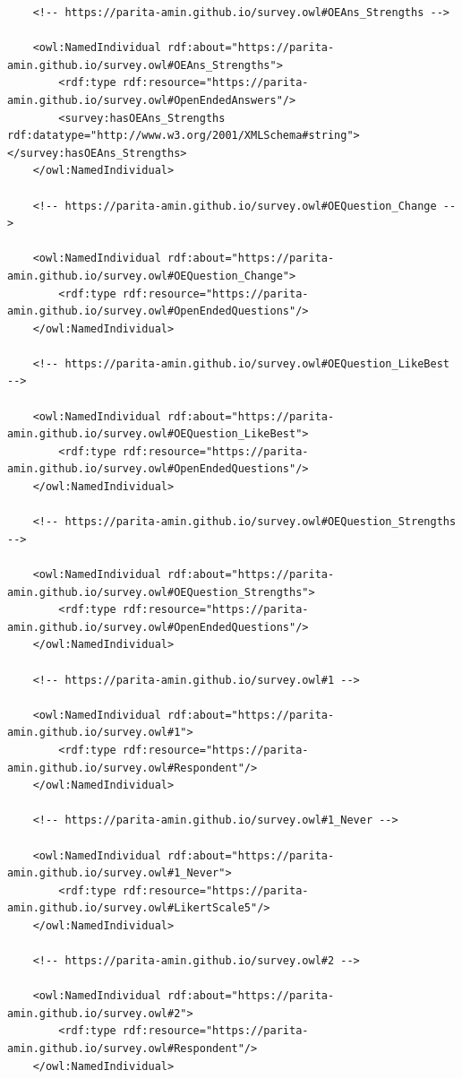\begin{lstlisting}
    <!-- https://parita-amin.github.io/survey.owl#OEAns_Strengths -->

    <owl:NamedIndividual rdf:about="https://parita-amin.github.io/survey.owl#OEAns_Strengths">
        <rdf:type rdf:resource="https://parita-amin.github.io/survey.owl#OpenEndedAnswers"/>
        <survey:hasOEAns_Strengths rdf:datatype="http://www.w3.org/2001/XMLSchema#string"></survey:hasOEAns_Strengths>
    </owl:NamedIndividual>
    
    <!-- https://parita-amin.github.io/survey.owl#OEQuestion_Change -->

    <owl:NamedIndividual rdf:about="https://parita-amin.github.io/survey.owl#OEQuestion_Change">
        <rdf:type rdf:resource="https://parita-amin.github.io/survey.owl#OpenEndedQuestions"/>
    </owl:NamedIndividual>
    
    <!-- https://parita-amin.github.io/survey.owl#OEQuestion_LikeBest -->

    <owl:NamedIndividual rdf:about="https://parita-amin.github.io/survey.owl#OEQuestion_LikeBest">
        <rdf:type rdf:resource="https://parita-amin.github.io/survey.owl#OpenEndedQuestions"/>
    </owl:NamedIndividual>
    
    <!-- https://parita-amin.github.io/survey.owl#OEQuestion_Strengths -->

    <owl:NamedIndividual rdf:about="https://parita-amin.github.io/survey.owl#OEQuestion_Strengths">
        <rdf:type rdf:resource="https://parita-amin.github.io/survey.owl#OpenEndedQuestions"/>
    </owl:NamedIndividual>
    
    <!-- https://parita-amin.github.io/survey.owl#1 -->

    <owl:NamedIndividual rdf:about="https://parita-amin.github.io/survey.owl#1">
        <rdf:type rdf:resource="https://parita-amin.github.io/survey.owl#Respondent"/>
    </owl:NamedIndividual>
    
    <!-- https://parita-amin.github.io/survey.owl#1_Never -->

    <owl:NamedIndividual rdf:about="https://parita-amin.github.io/survey.owl#1_Never">
        <rdf:type rdf:resource="https://parita-amin.github.io/survey.owl#LikertScale5"/>
    </owl:NamedIndividual>
    
    <!-- https://parita-amin.github.io/survey.owl#2 -->

    <owl:NamedIndividual rdf:about="https://parita-amin.github.io/survey.owl#2">
        <rdf:type rdf:resource="https://parita-amin.github.io/survey.owl#Respondent"/>
    </owl:NamedIndividual>
    

\end{lstlisting}
